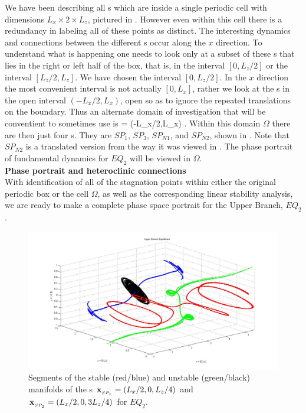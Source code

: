 \documentclass[letter,12pt,openany]{article}
\begin{document}
   We have been describing all \stagp s which are
   inside a single periodic cell with dimensions $L_x \times 2 \times L_z$, pictured in . However even within this cell
   there is a redundancy in labeling all of these points as
   distinct. 
   The interesting dynamics and connections between the different \stagp s occur
 along the $x$ direction. To understand what is happening one needs
 to look only at a subset of these \stagp s that lies in the right or left half of the box, that
 is, in the interval $[0,L_{z}/2]$ or the interval $[L_{z}/2,L_{z}]$. We have chosen
 the interval $[0,L_{z}/2]$. In
 the $x$ direction the most convenient interval is not actually
 $[0,L_{x}]$, rather we look at the \stagp s in the open interval
 $(-L_{x}/2,L_{x})$, open so as to ignore the repeated translations on the boundary. Thus an alternate domain of investigation that will be conventient to sometimes use is
 \beq \Omega = (-L_{x}/2,L_{x}) \times [-1,1] \times [0,L_{z}/2].
 \eeq
 Within this domain $\Omega$ there are then just four \stagp s. They are $SP_1$, $SP_3$, $SP_{N1}$, and
 $SP_{N2}$, shown in
  . Note that $SP_{N2}$ is a
 translated version from the way it was viewed in
 . The phase portrait of fundamental dynamics for $EQ_2$ will be viewed in $\Omega$.  \\ 
   
   


\noindent \textbf{Phase portrait and heteroclinic connections} \\


With identification of all of the stagnation points within either the original periodic box or the cell $\Omega$, as well as the corresponding linear stability analysis, we are ready to make a complete phase space portrait for the Upper Branch, $EQ_2$. \\

\begin{figure}[!h]
\includegraphics[width=1.0\textwidth]{manifolds_both.jpg}
  \caption{
   Segments of the stable (red/blue) and unstable (green/black) manifolds of the \stagp s
   $\bold{x}_{_{SP_{1}}} = (L_x/2,0,L_z/4)$ and
   $\bold{x}_{_{SP_{2}}} = (L_x/2,0,3L_z/4)$ for $EQ_2$. 
   }
  \label{eltonFig:manifolds_both}
 \end{figure}
\end{document}
